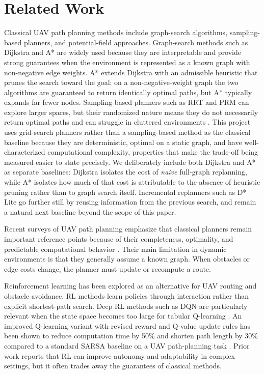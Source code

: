 \section{Related Work}
\label{sec:related-work}

Classical UAV path planning methods include graph-search algorithms, sampling-based planners, and potential-field approaches. Graph-search methods such as Dijkstra and A* are widely used because they are interpretable and provide strong guarantees when the environment is represented as a known graph with non-negative edge weights. A* \cite{hart1968astar} extends Dijkstra with an admissible heuristic that prunes the search toward the goal; on a non-negative-weight graph the two algorithms are guaranteed to return identically optimal paths, but A* typically expands far fewer nodes. Sampling-based planners such as RRT and PRM can explore larger spaces, but their randomized nature means they do not necessarily return optimal paths and can struggle in cluttered environments \cite{ghambari2024survey,venu2025comprehensive}. This project uses grid-search planners rather than a sampling-based method as the classical baseline because they are deterministic, optimal on a static graph, and have well-characterized computational complexity, properties that make the trade-off being measured easier to state precisely. We deliberately include both Dijkstra and A* as separate baselines: Dijkstra isolates the cost of \emph{naive} full-graph replanning, while A* isolates how much of that cost is attributable to the absence of heuristic pruning rather than to graph search itself. Incremental replanners such as D* Lite \cite{koenig2005dstarlite} go further still by reusing information from the previous search, and remain a natural next baseline beyond the scope of this paper.

Recent surveys of UAV path planning emphasize that classical planners remain important reference points because of their completeness, optimality, and predictable computational behavior \cite{mannan2023classical,ghambari2024survey,johnson2026rcsr}. Their main limitation in dynamic environments is that they generally assume a known graph. When obstacles or edge costs change, the planner must update or recompute a route.

Reinforcement learning has been explored as an alternative for UAV routing and obstacle avoidance. RL methods learn policies through interaction rather than explicit shortest-path search. Deep RL methods such as DQN are particularly relevant when the state space becomes too large for tabular Q-learning \cite{guo2023uav,tu2023uav,zhao2022path}. An improved Q-learning variant with revised reward and Q-value update rules has been shown to reduce computation time by 50\% and shorten path length by 30\% compared to a standard SARSA baseline on a UAV path-planning task \cite{tu2023uav}. Prior work reports that RL can improve autonomy and adaptability in complex settings, but it often trades away the guarantees of classical methods.

